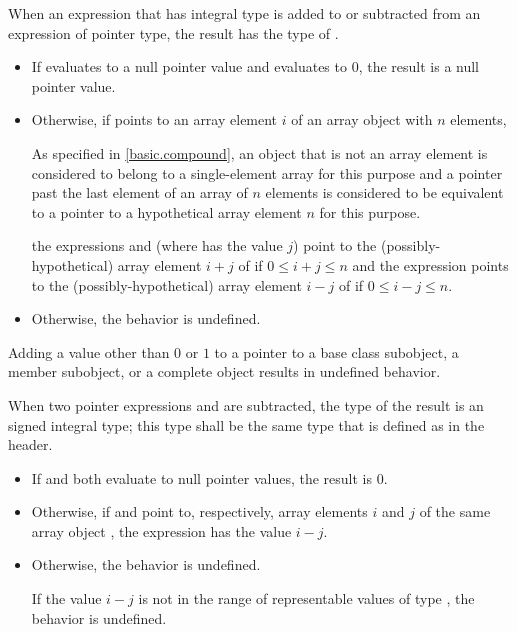 \pnum
{}%
When an expression  that has integral type
is added to or subtracted from an expression  of pointer type,
the result has the type of .
\begin{itemize}
\item If  evaluates to a null pointer value and
 evaluates to 0, the result is a null pointer value.
\item Otherwise, if  points to an array element $i$
of an array object  with $n$ elements,
\begin{footnote}
As specified in \ref{basic.compound},
an object that is not an array element
is considered to belong to a single-element array for this purpose and
a pointer past the last element of an array of $n$ elements
is considered to be equivalent to a pointer to a hypothetical array element
$n$ for this purpose.
\end{footnote}
the expressions  and 
(where  has the value $j$)
point to the (possibly-hypothetical) array element
$i + j$ of  if $0 \le i + j \le n$
and the expression 
points to the (possibly-hypothetical) array element
$i - j$ of  if $0 \le i - j \le n$.
\item Otherwise, the behavior is undefined.
\end{itemize}
\begin{note}
Adding a value other than $0$ or $1$
to a pointer to a base class subobject, a member subobject,
or a complete object results in undefined behavior.
\end{note}

\pnum
{}%
%
%
%
When two pointer expressions  and  are subtracted,
the type of the result is an  signed
integral type; this type shall be the same type that is defined as
 in the 
header.
\begin{itemize}
\item If  and  both evaluate to null pointer values,
the result is 0.
\item Otherwise, if  and  point to, respectively,
array elements $i$ and $j$
of the same array object ,
the expression  has the value $i - j$.
\item Otherwise, the behavior is undefined.
\begin{note}
If the value $i - j$
is not in the range of representable values
of type ,
the behavior is undefined.
\end{note}
\end{itemize}


